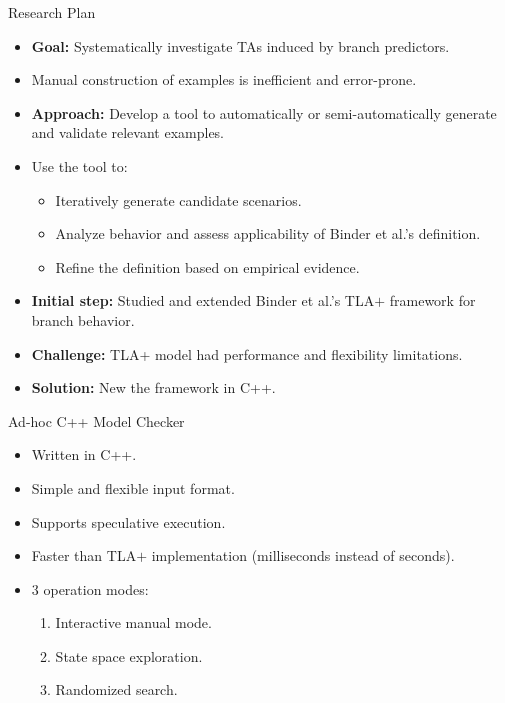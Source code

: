 \documentclass{beamer}
\begin{document}
\begin{frame}{Research Plan}
    \begin{itemize}
        \item \textbf{Goal:} Systematically investigate TAs induced by branch predictors.
        \item Manual construction of examples is inefficient and error-prone.
        \item \textbf{Approach:} Develop a tool to automatically or semi-automatically generate and validate relevant examples.
        \item Use the tool to:
        \begin{itemize}
            \item Iteratively generate candidate scenarios.
            \item Analyze behavior and assess applicability of Binder et al.'s definition.
            \item Refine the definition based on empirical evidence.
        \end{itemize}
        \item \textbf{Initial step:} Studied and extended Binder et al.'s TLA$+$ framework for branch behavior.
        \item \textbf{Challenge:} TLA+ model had performance and flexibility limitations.
        \item \textbf{Solution:} New the framework in C++.
    \end{itemize}
\end{frame}

\begin{frame}{Ad-hoc C++ Model Checker}
    \begin{itemize}
        \item Written in C++.
        \item Simple and flexible input format.
        \item Supports speculative execution.
        \item Faster than TLA$+$ implementation (milliseconds instead of seconds).
        \item 3 operation modes:
        \begin{enumerate}
            \item Interactive manual mode.
            \item State space exploration.
            \item Randomized search.
        \end{enumerate}
    \end{itemize}
\end{frame}
\end{document}
